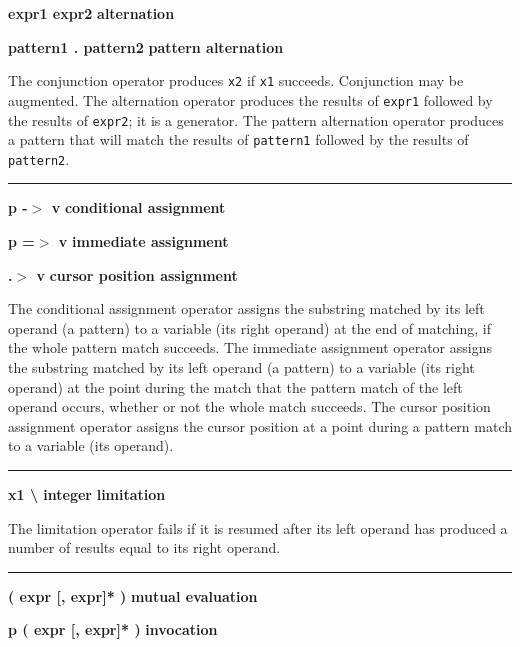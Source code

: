 \noindent
{\bf expr1 {\textbar} expr2 } \hfill {\bf alternation}

\noindent
{\bf pattern1 .{\textbar} pattern2 } \hfill {\bf pattern alternation}

\noindent
The conjunction operator produces \texttt{x2} if
\texttt{x1} succeeds. Conjunction may be augmented.
The 
alternation operator produces the results of \texttt{expr1} followed
by the results of \texttt{expr2}; it is a generator.
The 
pattern alternation operator produces a pattern that will match
the results of \texttt{pattern1} followed
by the results of \texttt{pattern2}.


\bigskip\hrule\vspace{0.1cm}
\noindent
{\bf p -$>$ v } \hfill {\bf conditional assignment}

\noindent
{\bf p =$>$ v } \hfill {\bf immediate assignment}

\noindent
{\bf  .$>$ v } \hfill {\bf cursor position assignment}

\noindent
The  conditional assignment operator
assigns the substring matched by its left operand (a pattern) to a
variable (its right operand) at the end of matching, if the whole
pattern match succeeds.
The  immediate assignment operator assigns
the substring matched by its left operand (a pattern) to a variable
(its right operand) at the point during the match that the pattern
match of the left operand occurs, whether or not the whole match succeeds.
The cursor position assignment operator
assigns the cursor position at a point during a pattern match to a
variable (its operand).



\bigskip\hrule\vspace{0.1cm}
\noindent
{\bf x1 {\textbackslash} integer } \hfill {\bf limitation}

\noindent
The limitation operator fails if it
is resumed after its left operand has produced a number of results
equal to its right operand.

\bigskip\hrule\vspace{0.1cm}
\noindent
{\bf ( expr [, expr]* ) } \hfill {\bf mutual evaluation}

\noindent
{\bf p ( expr [, expr]* ) } \hfill {\bf invocation}

